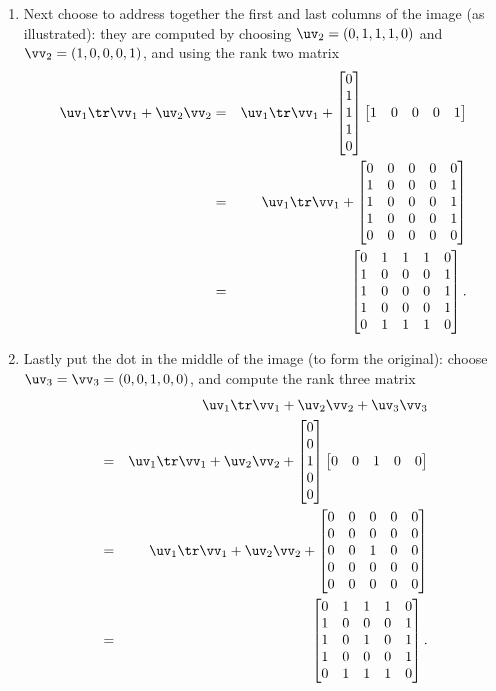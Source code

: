 \begin{example}
\begin{solution}
\begin{enumerate}
\item Next choose to address together the first and last columns of the image (as illustrated): they are computed by choosing  \(\uv_2=(0,1,1,1,0)\) and \(\vv_2=(1,0,0,0,1)\), and using the rank two matrix
\marginpar{}
\begin{eqnarray*}
\uv_1\tr\vv_1+\uv_2\vv_2
&=&\uv_1\tr\vv_1+\begin{bmatrix} 0\\1\\1\\1\\0 \end{bmatrix}
\begin{bmatrix} 1&0&0&0&1 \end{bmatrix}
\\&=&\uv_1\tr\vv_1+\begin{bmatrix} 0&0&0&0&0
\\1&0&0&0&1
\\1&0&0&0&1
\\1&0&0&0&1
\\0&0&0&0&0 \end{bmatrix}
\\&=&\begin{bmatrix} 0&1&1&1&0
\\1&0&0&0&1
\\1&0&0&0&1
\\1&0&0&0&1
\\0&1&1&1&0 \end{bmatrix}.
\end{eqnarray*}

\item Lastly put the dot in the middle of the image (to form the original): choose  \(\uv_3=\vv_3=(0,0,1,0,0)\), and compute the rank three matrix
\begin{eqnarray*}
&&\uv_1\tr\vv_1+\uv_2\vv_2+\uv_3\vv_3
\\&=&\uv_1\tr\vv_1+\uv_2\vv_2
+\begin{bmatrix} 0\\0\\1\\0\\0 \end{bmatrix}
\begin{bmatrix} 0&0&1&0&0 \end{bmatrix}
\\&=&\uv_1\tr\vv_1+\uv_2\vv_2+\begin{bmatrix} 0&0&0&0&0
\\0&0&0&0&0
\\0&0&1&0&0
\\0&0&0&0&0
\\0&0&0&0&0 \end{bmatrix}
\\&=&\begin{bmatrix} 0&1&1&1&0
\\1&0&0&0&1
\\1&0&1&0&1
\\1&0&0&0&1
\\0&1&1&1&0 \end{bmatrix}.
\end{eqnarray*}


\end{enumerate}
\end{solution}
\end{example}
